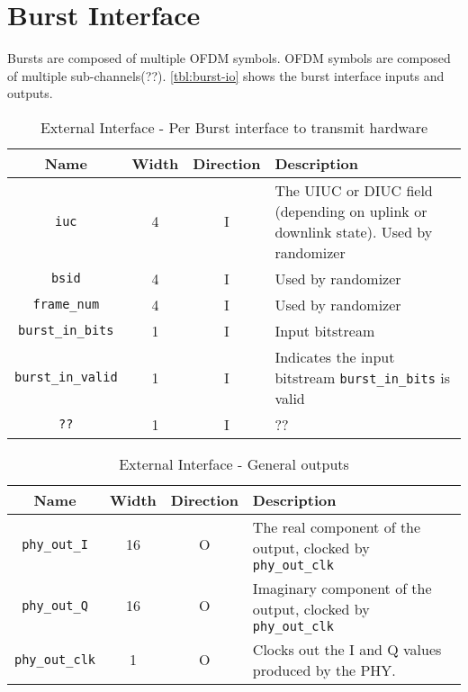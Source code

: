\documentclass[dvips,10pt,twocolumn]{article}
\begin{document}
\section{Burst Interface}
\label{sec:burst}

Bursts are composed of multiple OFDM symbols. OFDM symbols are composed of
multiple sub-channels(??). \autoref{tbl:burst-io} shows the burst
interface inputs and outputs.

\begin{table*}
\begin{tabularx}{\textwidth}{c|c|c|X}
	\label{tbl:burst-io}
	Name & Width & Direction & Description\\ \hline

	\texttt{iuc} & 4 & I & The UIUC or DIUC field (depending on uplink
	or downlink state). Used by randomizer\\
	
	\texttt{bsid} & 4 & I & Used by randomizer \\
	
	\texttt{frame\_num} & 4 & I & Used by randomizer \\

	\texttt{burst\_in\_bits} & 1 & I & Input bitstream \\

	\texttt{burst\_in\_valid} & 1 &  I & Indicates the input bitstream
	\texttt{burst\_in\_bits} is valid \\

	\texttt{??} & 1 & I & ??


\end{tabularx}
\caption{External Interface - Per Burst interface to transmit hardware}
\end{table*}

\begin{table*}
\begin{tabularx}{\textwidth}{c|c|c|X}
	\label{tbl:extern-io}
	Name & Width & Direction & Description\\ \hline

	\texttt{phy\_out\_I} & 16 & O & The real component of the output,
	clocked by \texttt{phy\_out\_clk} \\

	\texttt{phy\_out\_Q} & 16 & O & Imaginary component of the output,
	clocked by \texttt{phy\_out\_clk} \\

	\texttt{phy\_out\_clk} & 1 & O & Clocks out the I and Q values
	produced by the PHY.

\end{tabularx}
\caption{External Interface - General outputs}
\end{table*}
\end{document}
